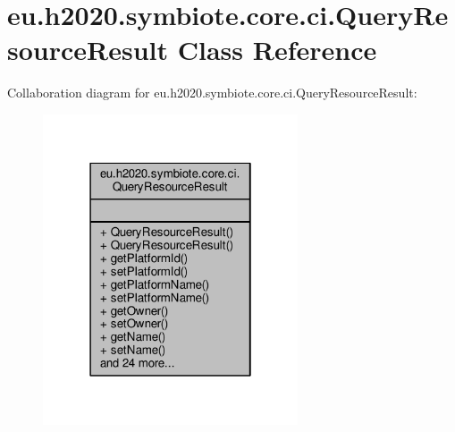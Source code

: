 \hypertarget{classeu_1_1h2020_1_1symbiote_1_1core_1_1ci_1_1QueryResourceResult}{}\section{eu.\+h2020.\+symbiote.\+core.\+ci.\+Query\+Resource\+Result Class Reference}
\label{classeu_1_1h2020_1_1symbiote_1_1core_1_1ci_1_1QueryResourceResult}


Collaboration diagram for eu.\+h2020.\+symbiote.\+core.\+ci.\+Query\+Resource\+Result\+:\nopagebreak
\begin{figure}[H]
\begin{center}
\leavevmode
\includegraphics[width=214pt]{classeu_1_1h2020_1_1symbiote_1_1core_1_1ci_1_1QueryResourceResult__coll__graph}
\end{center}
\end{figure}
